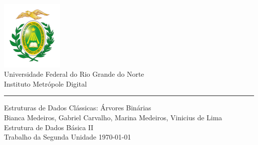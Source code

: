 \documentclass[a4paper,11pt,oneside]{book}
\begin{document}

\frontmatter

\begin{titlepage}
	\begin{center}
		\includegraphics[width=3cm]{figures/ufrnlogo.png}\\[0.5cm]
		{\LARGE Universidade Federal do Rio Grande do Norte\\[0.5cm]
		Instituto Metrópole Digital}\\[2cm]
		{\color{blue} \rule{\textwidth}{1pt}}
		\linespread{1.2}\huge {
			Estruturas de Dados Clássicas: Árvores Binárias
		}
		\linespread{1}~\\[2cm]
		{\Large
		Bianca Medeiros,
		Gabriel Carvalho,
		Marina Medeiros,
		Vinicius de Lima
		}\\[1cm]

		{\large
		\emph{} Estrutura de Dados Básica II}\\[1cm] %

		\large Trabalho da Segunda Unidade
		\vfill
		\today
	\end{center}
\end{titlepage}


\tableofcontents

\mainmatter







\nocite{*}
\end{document}

